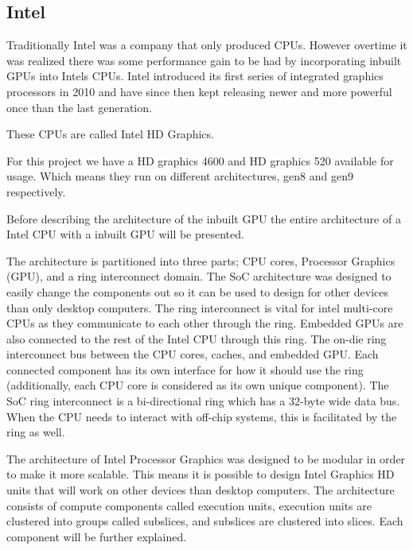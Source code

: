 \subsection{Intel}
Traditionally Intel was a company that only produced \glspl{CPU}. However overtime it was realized there was some performance gain to be had by incorporating inbuilt \glspl{GPU} into Intels \glspl{CPU}.
Intel introduced its first series of integrated graphics processors in 2010 and have since then kept releasing newer and more powerful once than the last generation. 

These \glspl{CPU} are called Intel HD Graphics. 

For this project we have a HD graphics 4600 and HD graphics 520 available for usage. Which means they run on different architectures, gen8 and gen9 respectively.

Before describing the architecture of the inbuilt \gls{GPU} the entire architecture of a Intel \gls{CPU} with a inbuilt \gls{GPU} will be presented.


The architecture is partitioned into three parts; \gls{CPU} cores, Processor Graphics (\gls{GPU}), and a ring interconnect domain. 
The SoC architecture was designed to easily change the components out so it can be used to design for other devices than only desktop computers.
The ring interconnect is vital for intel multi-core \glspl{CPU} as they communicate to each other through the ring. 
Embedded \glspl{GPU} are also connected to the rest of the Intel \gls{CPU} through this ring.
The on-die ring interconnect bus between the \gls{CPU} cores, caches, and embedded \gls{GPU}. 
Each connected component has its own interface for how it should use the ring (additionally, each \gls{CPU} core is considered as its own unique component). 
The SoC ring interconnect is a bi-directional ring which has a 32-byte wide data bus.  
When the \gls{CPU} needs to interact with off-chip systems, this is facilitated by the ring as well. 

The architecture of Intel Processor Graphics was designed to be modular in order to make it more scalable. 
This means it is possible to design Intel Graphics HD units that will work on other devices than desktop computers. 
The architecture consists of compute components called execution units, execution units are clustered into groups called subslices, and subslices are clustered into slices. 
Each component will be further explained.

